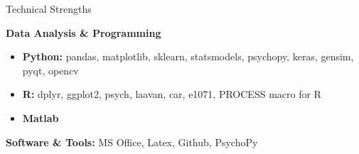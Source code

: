 \documentclass{resume} %
\begin{document}
\begin{rSection}{Technical Strengths}

{\bf Data Analysis \& Programming}
\begin{itemize}
\item {\bf Python: } pandas, matplotlib, sklearn, statsmodels, psychopy, keras, gensim, pyqt, opencv
\item {\bf R: } dplyr, ggplot2, psych, laavan, car, e1071, PROCESS macro for R
\item {\bf Matlab}

\end{itemize}
{\bf Software \& Tools: } MS Office, Latex, Github, PsychoPy

\end{rSection}


\end{document}
